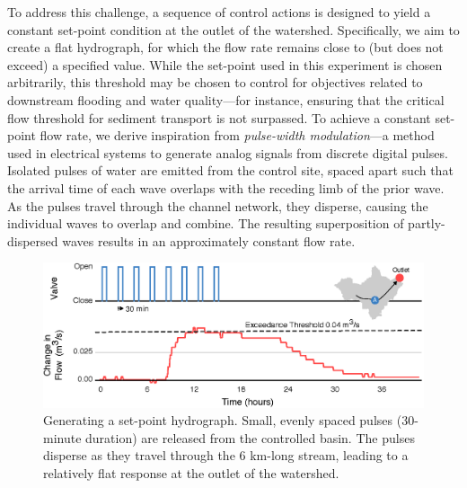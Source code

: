 To address this challenge, a sequence of control actions is designed to yield a constant set-point condition at the outlet of the watershed. Specifically, we aim to create a flat hydrograph, for which the flow rate remains close to (but does not exceed) a specified value. While the set-point used in this experiment is chosen arbitrarily, this threshold may be chosen to control for objectives related to downstream flooding and water quality---for instance, ensuring that the critical flow threshold for sediment transport is not surpassed.
To achieve a constant set-point flow rate, we derive inspiration from \textit{pulse-width modulation}---a method used in electrical systems to generate analog signals from discrete digital pulses. Isolated pulses of water are emitted from the control site, spaced apart such that the arrival time of each wave overlaps with the receding limb of the prior wave. As the pulses travel through the channel network, they disperse, causing the individual waves to overlap and combine. The resulting superposition of partly-dispersed waves results in an approximately constant flow rate.

\begin{figure}[H]
    \centering
    \includegraphics[width=\textwidth]{gfx/Chapter-2/Figure7.eps}
    \caption{Generating a set-point hydrograph. Small, evenly spaced pulses (30-minute duration) are released from the controlled basin. The pulses disperse as they travel through the 6 km-long stream, leading to a relatively flat response at the outlet of the watershed.}
    \label{fig:5}
\end{figure}

